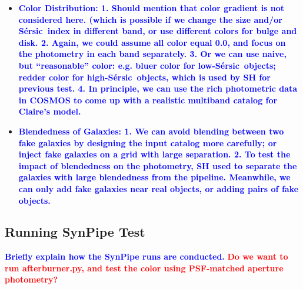 \documentclass{pasj01}
\def\ser{{S\'{e}rsic\ }}
\newcommand{\plan}[1]{\textcolor{blue} {\textbf{#1}}}
\newcommand{\todo}[1]{\textcolor{red} {\textbf{#1}}}
\begin{document}
\begin{itemize}
{                       of the diffuse models are due to problematic fitting results, especially 
                       at the faint end.  SH thinks that they should be removed.}
        \item \plan{\textbf{Color Distribution}:
                    1. Should mention that color gradient is not considered here.  
                       (which is possible if we change the size and/or \ser index in different 
                       band, or use different colors for bulge and disk.
                    2. Again, we could assume all color equal 0.0, and focus on the photometry 
                       in each band separately. 
                    3. Or we can use naive, but ``reasonable'' color: e.g. bluer color for 
                       low-\ser objects; redder color for high-\ser objects, which is used by SH
                       for previous test.
                    4. In principle, we can use the rich photometric data in COSMOS to come 
                       up with a realistic multiband catalog for Claire's model.}
       \item \plan{\textbf{Blendedness of Galaxies}:
                   1. We can avoid blending between two fake galaxies by designing the input 
                      catalog more carefully; or inject fake galaxies on a grid with large 
                      separation.
                   2. To test the impact of blendedness on the photometry, SH used to separate 
                      the galaxies with large blendedness from the pipeline. Meanwhile, we 
                      can only add fake galaxies near real objects, or adding pairs of fake 
                      objects.}
    \end{itemize}


\subsection{Running SynPipe Test}

    \plan{Briefly explain how the SynPipe runs are conducted.}
    \todo{Do we want to run afterburner.py, and test the color using PSF-matched 
          aperture photometry?}
          
\end{document}
